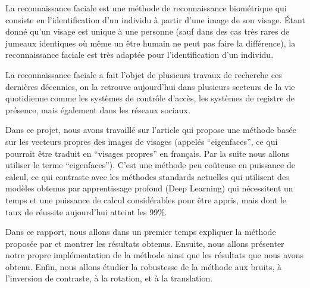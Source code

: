 La reconnaissance faciale est une méthode de reconnaissance biométrique
qui consiste en l'identification d'un individu à partir d'une image de son
visage. Étant donné qu'un visage est unique à une personne (sauf dans des cas très
rares de jumeaux identiques où même un être humain ne peut pas faire 
la différence), la reconnaissance faciale est très adaptée pour l'identification
d'un individu.

La reconnaissance faciale a fait l'objet de plusieurs travaux de recherche ces dernières décennies,
on la retrouve aujourd'hui dans plusieurs secteurs de la vie quotidienne comme les systèmes de
contrôle d'accès, les systèmes de registre de présence, mais également dans les réseaux sociaux.

Dans ce projet, nous avons travaillé sur l'article \cite{} qui propose une méthode
basée sur les vecteurs propres des images de visages (appelés ``eigenfaces'', ce qui pourrait être 
traduit en ``visages propres'' en français. Par la suite nous allons utiliser le terme ``eigenfaces'').
C'est une méthode peu coûteuse en puissance de calcul, ce qui contraste avec les méthodes standards
actuelles qui utilisent des modèles obtenus par apprentissage profond (Deep Learning) qui nécessitent un
temps et une puissance de calcul considérables pour être appris, mais dont le taux de réussite aujourd'hui
atteint les 99\%.

Dans ce rapport, nous allons dans un premier temps expliquer la méthode proposée par \cite{} et
montrer les résultats obtenus. Ensuite, nous allons présenter notre propre implémentation de la méthode
ainsi que les résultats que nous avons obtenu. Enfin, nous allons étudier la robustesse de la méthode
aux bruits, à l'inversion de contraste, à la rotation, et à la translation.